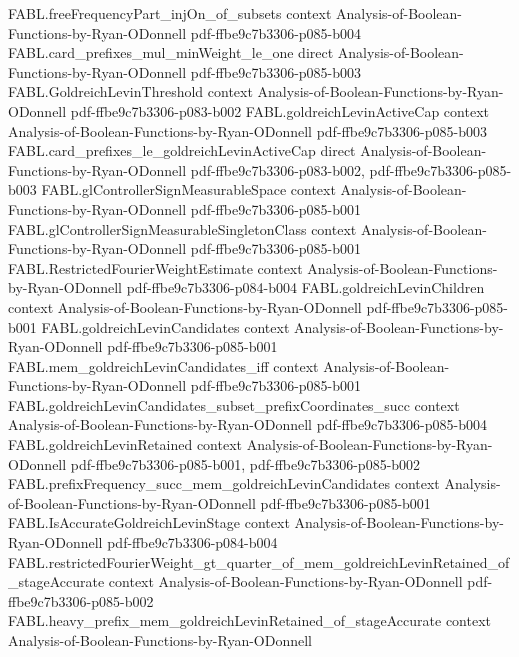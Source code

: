 \begin{theorem}
\proofstep
  {FABL.freeFrequencyPart_injOn_of_subsets}
  {context}
  {Analysis-of-Boolean-Functions-by-Ryan-ODonnell}
  {pdf-ffbe9c7b3306-p085-b004}
\proofstep
  {FABL.card_prefixes_mul_minWeight_le_one}
  {direct}
  {Analysis-of-Boolean-Functions-by-Ryan-ODonnell}
  {pdf-ffbe9c7b3306-p085-b003}
\proofstep
  {FABL.GoldreichLevinThreshold}
  {context}
  {Analysis-of-Boolean-Functions-by-Ryan-ODonnell}
  {pdf-ffbe9c7b3306-p083-b002}
\proofstep
  {FABL.goldreichLevinActiveCap}
  {context}
  {Analysis-of-Boolean-Functions-by-Ryan-ODonnell}
  {pdf-ffbe9c7b3306-p085-b003}
\proofstep
  {FABL.card_prefixes_le_goldreichLevinActiveCap}
  {direct}
  {Analysis-of-Boolean-Functions-by-Ryan-ODonnell}
  {pdf-ffbe9c7b3306-p083-b002,
    pdf-ffbe9c7b3306-p085-b003}
\proofstep
  {FABL.glControllerSignMeasurableSpace}
  {context}
  {Analysis-of-Boolean-Functions-by-Ryan-ODonnell}
  {pdf-ffbe9c7b3306-p085-b001}
\proofstep
  {FABL.glControllerSignMeasurableSingletonClass}
  {context}
  {Analysis-of-Boolean-Functions-by-Ryan-ODonnell}
  {pdf-ffbe9c7b3306-p085-b001}
\proofstep
  {FABL.RestrictedFourierWeightEstimate}
  {context}
  {Analysis-of-Boolean-Functions-by-Ryan-ODonnell}
  {pdf-ffbe9c7b3306-p084-b004}
\proofstep
  {FABL.goldreichLevinChildren}
  {context}
  {Analysis-of-Boolean-Functions-by-Ryan-ODonnell}
  {pdf-ffbe9c7b3306-p085-b001}
\proofstep
  {FABL.goldreichLevinCandidates}
  {context}
  {Analysis-of-Boolean-Functions-by-Ryan-ODonnell}
  {pdf-ffbe9c7b3306-p085-b001}
\proofstep
  {FABL.mem_goldreichLevinCandidates_iff}
  {context}
  {Analysis-of-Boolean-Functions-by-Ryan-ODonnell}
  {pdf-ffbe9c7b3306-p085-b001}
\proofstep
  {FABL.goldreichLevinCandidates_subset_prefixCoordinates_succ}
  {context}
  {Analysis-of-Boolean-Functions-by-Ryan-ODonnell}
  {pdf-ffbe9c7b3306-p085-b004}
\proofstep
  {FABL.goldreichLevinRetained}
  {context}
  {Analysis-of-Boolean-Functions-by-Ryan-ODonnell}
  {pdf-ffbe9c7b3306-p085-b001,
    pdf-ffbe9c7b3306-p085-b002}
\proofstep
  {FABL.prefixFrequency_succ_mem_goldreichLevinCandidates}
  {context}
  {Analysis-of-Boolean-Functions-by-Ryan-ODonnell}
  {pdf-ffbe9c7b3306-p085-b001}
\proofstep
  {FABL.IsAccurateGoldreichLevinStage}
  {context}
  {Analysis-of-Boolean-Functions-by-Ryan-ODonnell}
  {pdf-ffbe9c7b3306-p084-b004}
\proofstep
  {FABL.restrictedFourierWeight_gt_quarter_of_mem_goldreichLevinRetained_of_stageAccurate}
  {context}
  {Analysis-of-Boolean-Functions-by-Ryan-ODonnell}
  {pdf-ffbe9c7b3306-p085-b002}
\proofstep
  {FABL.heavy_prefix_mem_goldreichLevinRetained_of_stageAccurate}
  {context}
  {Analysis-of-Boolean-Functions-by-Ryan-ODonnell}

\end{theorem}
